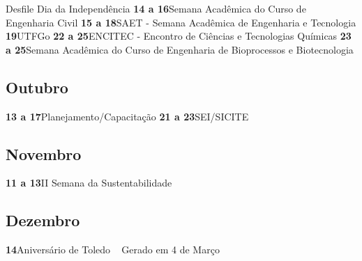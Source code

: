 \documentclass[thesis]{hmcposter}
\begin{document}
\begin{poster}
\quad \quad Desfile Dia da Independência \newline\textbf{14 a 16}\quad \quad Semana Acadêmica do Curso de Engenharia Civil \newline\textbf{15 a 18}\quad \quad SAET - Semana Acadêmica de Engenharia e Tecnologia \newline\textbf{19}\quad \quad \quad \quad UTFGo \newline\textbf{22 a 25}\quad \quad ENCITEC - Encontro de Ciências e Tecnologias Químicas \newline\textbf{23 a 25}\quad \quad Semana Acadêmica do Curso de Engenharia de Bioprocessos e Biotecnologia \newline\subsection{Outubro}\textbf{13 a 17}\quad \quad Planejamento/Capacitação \newline\textbf{21 a 23}\quad \quad SEI/SICITE \newline\subsection{Novembro}\textbf{11 a 13}\quad \quad II Semana da Sustentabilidade \newline\subsection{Dezembro}\textbf{14}\quad \quad \quad \quad Aniversário de Toledo \newline ~ \vfill \hfill \small \color{hmcorange}Gerado em 4 de Março \end{poster}
\end{document}
